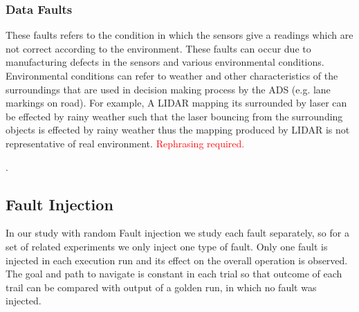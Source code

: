  \subsubsection{Data Faults} These faults refers to the condition in which the sensors give a readings which are not correct according to the environment. These faults can occur due to manufacturing defects in the sensors and various environmental conditions. Environmental conditions can refer to weather and other characteristics of the surroundings that are used in decision making process by the ADS (e.g. lane markings on road). For example, A LIDAR mapping its surrounded by laser can be effected by rainy weather such that the laser bouncing from the surrounding objects is effected by rainy weather thus the mapping produced by LIDAR is not representative of real environment.
 \textcolor{red}{Rephrasing required.}
 
.
 


\subsection{Fault Injection} \label{fi_m}


In our study with random Fault injection we study each fault separately, so for a set of related experiments we only inject one type of fault. Only one fault is injected in each execution run and its effect on the overall operation is observed. The goal and path to navigate is constant in each trial so that outcome of each trail can be compared with output of a golden run, in which no fault was injected. 

